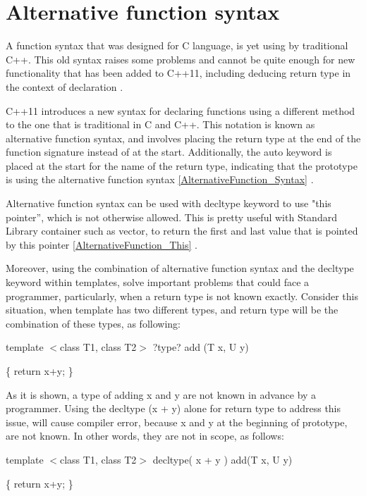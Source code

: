 \documentclass[11pt]{report}
\begin{document}
\section{Alternative function syntax}
\label{section: Alternative function syntax}
A function syntax that was designed for C language, is yet using by traditional C++. This old syntax raises some problems and cannot be quite enough for new functionality that has been added to C++11, including deducing return type in the context of declaration \cite{Gregorie:professionalcpp}.


C++11 introduces a new syntax for declaring functions using a different method to the one that is traditional in C and C++. This notation is known as alternative function syntax, and involves placing the return type at the end of the function signature instead of at the start. Additionally, the auto keyword is placed at the start for the name of the return type, indicating that the prototype is using the alternative function syntax \ref{AlternativeFunction_Syntax} \cite{Gregorie:professionalcpp}.


Alternative function syntax can be used with decltype keyword to use "this pointer”, which is not otherwise allowed. This is pretty useful with Standard Library container such as vector, to return the first and last value that is pointed by this pointer \ref{AlternativeFunction_This} \cite{ISO:2011:Cpplanguage}. 


Moreover, using the combination of alternative function syntax and the decltype keyword within templates, solve important problems that could face a programmer, particularly, when a return type is not known exactly.  Consider this situation, when template has two different types, and return type will be the combination of these types, as following:
\begin{center}
template $<$class T1, class T2$>$  ?type? add (T x, U y) 


\{ return x+y; \}
\end{center}

As it is shown, a type of adding x and y are not known in advance by a programmer. Using the decltype (x + y) alone for return type to address this issue, will cause compiler error, because x and y at the beginning of prototype, are not known.  In other words, they are not in scope, as follows:

\begin{center}
template $<$class T1, class T2$>$  decltype( x + y ) add(T x, U y)


\{ return x+y; \}
\end{center}
\end{document}
